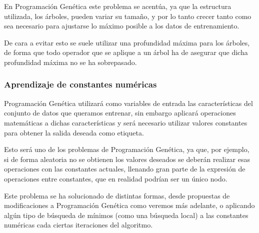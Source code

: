 En Programación Genética este problema se acentúa, ya que la estructura utilizada, los árboles, pueden variar su tamaño, y por lo tanto crecer tanto como sea necesario para ajustarse lo máximo posible a los datos de entrenamiento.

De cara a evitar esto se suele utilizar una profundidad máxima para los árboles, de forma que todo operador que se aplique a un árbol ha de asegurar que dicha profundidad máxima no se ha sobrepasado.

\subsubsection{Aprendizaje de constantes numéricas}

Programación Genética utilizará como variables de entrada las características del conjunto de datos que queramos entrenar, sin embargo aplicará operaciones matemáticas a dichas características y será necesario utilizar valores constantes para obtener la salida deseada como etiqueta.

Esto será uno de los problemas de Programación Genética, ya que, por ejemplo, si de forma aleatoria no se obtienen los valores deseados se deberán realizar esas operaciones con las constantes actuales, llenando gran parte de la expresión de operaciones entre constantes, que en realidad podrían ser un único nodo.

Este problema se ha solucionado de distintas formas, desde propuestas de modificaciones a Programación Genética como veremos más adelante, o aplicando algún tipo de búsqueda de mínimos (como una búsqueda local) a las constantes numéricas cada ciertas iteraciones del algoritmo.


\newpage
